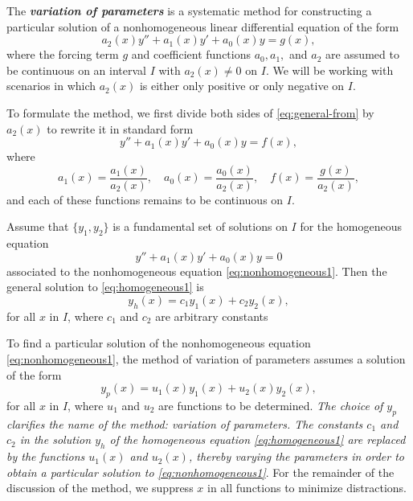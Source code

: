 The \textbf{\textit{variation of parameters}} is a systematic method for constructing a particular solution of a  nonhomogeneous linear differential equation of the form
\begin{equation}\label{eq:general-from}
	a_2(x) y'' + a_1(x) y' + a_0(x) y = g(x),
\end{equation}
where the forcing term $g$ and  coefficient functions $a_0, a_1,$ and $a_2$ are assumed to be continuous on an interval $I$ with $a_2(x)\ne 0$    on $I.$  We will be working with scenarios in which $a_2(x)$ is either only positive or only negative on  $I$. 

To formulate the method, we first divide both sides of \eqref{eq:general-from} by $a_2(x)$ to rewrite it in standard form
\begin{equation}\label{eq:nonhomogeneous1}
	y'' + a_1(x) y' + a_0(x) y = f(x),
\end{equation}
where 
\[
a_1(x) = \frac{a_1(x)}{a_2(x)}, 
\quad 
a_0(x) = \frac{a_0(x)}{a_2(x)}, 
\quad 
f(x) = \frac{g(x)}{a_2(x)},
\]
and each of these functions remains to be continuous on $I$.

Assume that $\{ y_1, y_2 \}$ is a fundamental set of solutions on $I$ for the  homogeneous equation
\begin{equation}\label{eq:homogeneous1}
	y'' + a_1(x) y' + a_0(x) y = 0
\end{equation} associated to the nonhomogeneous equation \eqref{eq:nonhomogeneous1}. Then the general solution to \eqref{eq:homogeneous1} is
\begin{equation}\label{VOP-4}
	y_h(x) = c_1 y_1(x) + c_2 y_2(x),
\end{equation}
for all $x$ in $I$,
where $c_1$ and $c_2$ are arbitrary constants

To find a particular solution of the nonhomogeneous equation \eqref{eq:nonhomogeneous1}, the method of variation of parameters assumes a solution of the form
\[
y_p(x) = u_1(x) y_1(x) + u_2(x) y_2(x),
\] for all $x$ in $I$,
where $u_1$ and $u_2$ are functions to be determined.   \textit{The choice of $y_p$ clarifies the name of the method:  variation of parameters. The constants $c_1$ and $c_2$ in the  solution $y_h$ of the homogeneous equation \eqref{eq:homogeneous1} are replaced by the functions $u_1(x)$ and $u_2(x)$, thereby \textit{varying} the parameters in order to obtain a particular solution
	to \eqref{eq:nonhomogeneous1}}. For the remainder of the discussion of the method, we suppress  $x$ in all functions  to minimize distractions. 

